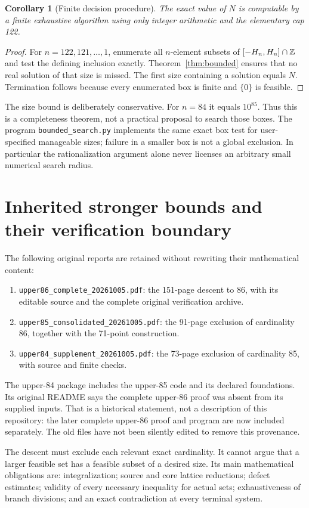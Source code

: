 \documentclass[11pt,a4paper]{article}
\newtheorem{corollary}[theorem]{Corollary}
\theoremstyle{remark}\newtheorem{remark}[theorem]{Remark}
\begin{document}
\begin{corollary}[Finite decision procedure]\label{cor:algorithm}
The exact value of $N$ is computable by a finite exhaustive algorithm using only integer arithmetic and the elementary cap 122.
\end{corollary}
\begin{proof}
For $n=122,121,\ldots,1$, enumerate all $n$-element subsets of $[-H_n,H_n]\cap\mathbb Z$ and test the defining inclusion exactly. Theorem~\ref{thm:bounded} ensures that no real solution of that size is missed. The first size containing a solution equals $N$. Termination follows because every enumerated box is finite and $\{0\}$ is feasible.
\end{proof}
The size bound is deliberately conservative. For $n=84$ it equals $10^{85}$. Thus this is a completeness theorem, not a practical proposal to search those boxes. The program \texttt{bounded\_search.py} implements the same exact box test for user-specified manageable sizes; failure in a smaller box is not a global exclusion. In particular the rationalization argument alone never licenses an arbitrary small numerical search radius.

\section{Inherited stronger bounds and their verification boundary}
The following original reports are retained without rewriting their mathematical content:
\begin{enumerate}
\item \texttt{upper86\_complete\_20261005.pdf}: the 151-page descent to 86, with its editable source and the complete original verification archive.
\item \texttt{upper85\_consolidated\_20261005.pdf}: the 91-page exclusion of cardinality 86, together with the 71-point construction.
\item \texttt{upper84\_supplement\_20261005.pdf}: the 73-page exclusion of cardinality 85, with source and finite checks.
\end{enumerate}
The upper-84 package includes the upper-85 code and its declared foundations. Its original README says the complete upper-86 proof was absent from its supplied inputs. That is a historical statement, not a description of this repository: the later complete upper-86 proof and program are now included separately. The old files have not been silently edited to remove this provenance.

The descent must exclude each relevant exact cardinality. It cannot argue that a larger feasible set has a feasible subset of a desired size. Its main mathematical obligations are: integralization; source and core lattice reductions; defect estimates; validity of every necessary inequality for actual sets; exhaustiveness of branch divisions; and an exact contradiction at every terminal system.
\end{document}
